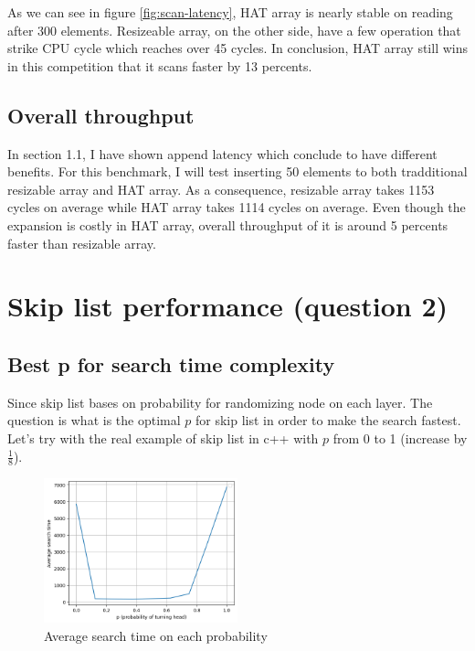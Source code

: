 \documentclass[a4paper, 12pt]{report}
\begin{document}
As we can see in figure \ref{fig:scan-latency}, HAT array is nearly stable on reading after 300 elements.
Resizeable array, on the other side, have a few operation that strike CPU cycle which reaches over 45 cycles.
In conclusion, HAT array still wins in this competition that it scans faster by 13 percents.

\section{Overall throughput}

In section 1.1, I have shown append latency which conclude to have different benefits.
For this benchmark, I will test inserting 50 elements to both tradditional resizable array and
HAT array. As a consequence, resizable array takes 1153 cycles on average while HAT array takes
1114 cycles on average. Even though the expansion is costly in HAT array, overall throughput
of it is around 5 percents faster than resizable array.

\chapter{Skip list performance (question 2)}

\section{Best p for search time complexity}
Since skip list bases on probability for randomizing node on each layer. The question is what is the optimal $p$ for skip list
in order to make the search fastest. Let's try with the real example of skip list in c++ with $p$ from 0 to 1 (increase by $\frac{1}{8}$).

\begin{figure}[h]
        \centering
        \includegraphics[width=0.5\textwidth,scale=0.2]{best_p_for_search.png}
        \caption{\label{fig:best-p-for-search} Average search time on each probability}
\end{figure}
\end{document}
